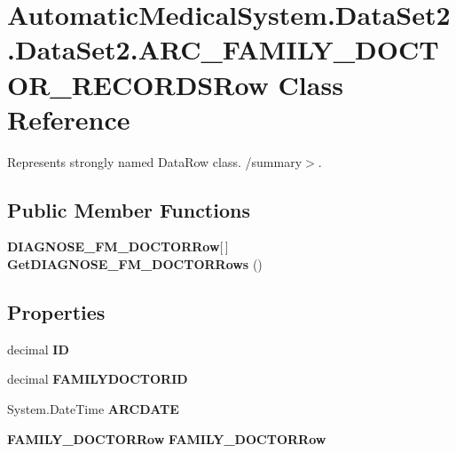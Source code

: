 \section{AutomaticMedicalSystem.DataSet2.DataSet2.ARC\_\-FAMILY\_\-DOCTOR\_\-RECORDSRow Class Reference}
\label{class_automatic_medical_system_1_1_data_set2_1_1_a_r_c___f_a_m_i_l_y___d_o_c_t_o_r___r_e_c_o_r_d_s_row}
Represents strongly named DataRow class. /summary$>$.  


\subsection*{Public Member Functions}
\begin{CompactItemize}
\item 
{\bf DIAGNOSE\_\-FM\_\-DOCTORRow}[$\,$] \textbf{GetDIAGNOSE\_\-FM\_\-DOCTORRows} ()\label{class_automatic_medical_system_1_1_data_set2_1_1_a_r_c___f_a_m_i_l_y___d_o_c_t_o_r___r_e_c_o_r_d_s_row_c1629a4023ac3dca80a2132965d2bc1e}

\end{CompactItemize}
\subsection*{Properties}
\begin{CompactItemize}
\item 
decimal \textbf{ID}\hspace{0.3cm}{\tt  [get, set]}\label{class_automatic_medical_system_1_1_data_set2_1_1_a_r_c___f_a_m_i_l_y___d_o_c_t_o_r___r_e_c_o_r_d_s_row_d6c91c9495bc23fed03fd9cb67ef6368}

\item 
decimal \textbf{FAMILYDOCTORID}\hspace{0.3cm}{\tt  [get, set]}\label{class_automatic_medical_system_1_1_data_set2_1_1_a_r_c___f_a_m_i_l_y___d_o_c_t_o_r___r_e_c_o_r_d_s_row_84a1953400010e89bce4f91e6bee87dd}

\item 
System.DateTime \textbf{ARCDATE}\hspace{0.3cm}{\tt  [get, set]}\label{class_automatic_medical_system_1_1_data_set2_1_1_a_r_c___f_a_m_i_l_y___d_o_c_t_o_r___r_e_c_o_r_d_s_row_03cddbf197fe30f8e814439032d0e2ba}

\item 
{\bf FAMILY\_\-DOCTORRow} \textbf{FAMILY\_\-DOCTORRow}\hspace{0.3cm}{\tt  [get, set]}\label{class_automatic_medical_system_1_1_data_set2_1_1_a_r_c___f_a_m_i_l_y___d_o_c_t_o_r___r_e_c_o_r_d_s_row_e3f6cbc0b84628da36a0c633553e9b27}

\end{CompactItemize}


